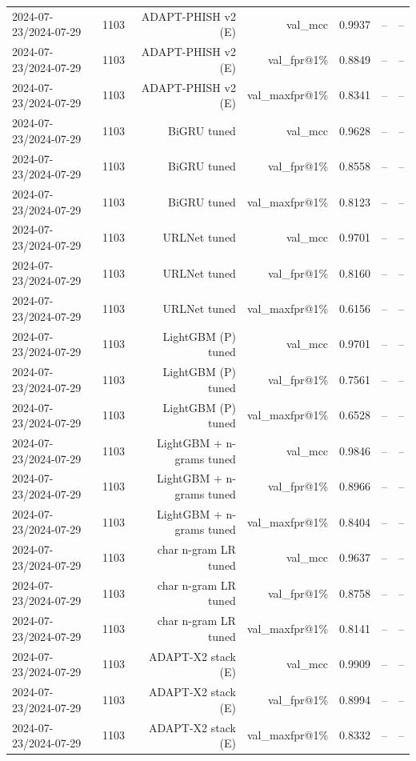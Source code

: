 \begin{table}[t]
\begin{tabular}{llrrrrr}
2024-07-23/2024-07-29 & 1103 & ADAPT-PHISH v2 (E) & val\_mcc & 0.9937 & -- & -- \\
2024-07-23/2024-07-29 & 1103 & ADAPT-PHISH v2 (E) & val\_fpr@1\% & 0.8849 & -- & -- \\
2024-07-23/2024-07-29 & 1103 & ADAPT-PHISH v2 (E) & val\_maxfpr@1\% & 0.8341 & -- & -- \\
2024-07-23/2024-07-29 & 1103 & BiGRU tuned & val\_mcc & 0.9628 & -- & -- \\
2024-07-23/2024-07-29 & 1103 & BiGRU tuned & val\_fpr@1\% & 0.8558 & -- & -- \\
2024-07-23/2024-07-29 & 1103 & BiGRU tuned & val\_maxfpr@1\% & 0.8123 & -- & -- \\
2024-07-23/2024-07-29 & 1103 & URLNet tuned & val\_mcc & 0.9701 & -- & -- \\
2024-07-23/2024-07-29 & 1103 & URLNet tuned & val\_fpr@1\% & 0.8160 & -- & -- \\
2024-07-23/2024-07-29 & 1103 & URLNet tuned & val\_maxfpr@1\% & 0.6156 & -- & -- \\
2024-07-23/2024-07-29 & 1103 & LightGBM (P) tuned & val\_mcc & 0.9701 & -- & -- \\
2024-07-23/2024-07-29 & 1103 & LightGBM (P) tuned & val\_fpr@1\% & 0.7561 & -- & -- \\
2024-07-23/2024-07-29 & 1103 & LightGBM (P) tuned & val\_maxfpr@1\% & 0.6528 & -- & -- \\
2024-07-23/2024-07-29 & 1103 & LightGBM + n-grams tuned & val\_mcc & 0.9846 & -- & -- \\
2024-07-23/2024-07-29 & 1103 & LightGBM + n-grams tuned & val\_fpr@1\% & 0.8966 & -- & -- \\
2024-07-23/2024-07-29 & 1103 & LightGBM + n-grams tuned & val\_maxfpr@1\% & 0.8404 & -- & -- \\
2024-07-23/2024-07-29 & 1103 & char n-gram LR tuned & val\_mcc & 0.9637 & -- & -- \\
2024-07-23/2024-07-29 & 1103 & char n-gram LR tuned & val\_fpr@1\% & 0.8758 & -- & -- \\
2024-07-23/2024-07-29 & 1103 & char n-gram LR tuned & val\_maxfpr@1\% & 0.8141 & -- & -- \\
2024-07-23/2024-07-29 & 1103 & ADAPT-X2 stack (E) & val\_mcc & 0.9909 & -- & -- \\
2024-07-23/2024-07-29 & 1103 & ADAPT-X2 stack (E) & val\_fpr@1\% & 0.8994 & -- & -- \\
2024-07-23/2024-07-29 & 1103 & ADAPT-X2 stack (E) & val\_maxfpr@1\% & 0.8332 & -- & -- \\

\end{tabular}
\end{table}

